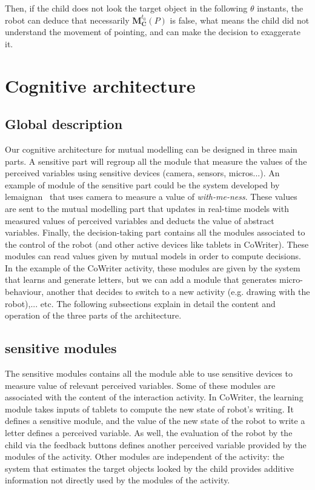 \documentclass[10pt,a4paper,twocolumn]{article}
\begin{document}
Then, if the child does not look the target object in the following $\theta$ instants, the robot can deduce that necessarily  $\textbf{M}^{t_0}_\textbf{C}(P)$ is false, what means the child did not understand the movement of pointing, and can make the decision to exaggerate it. 


\section{Cognitive architecture}

\subsection{Global description}

Our cognitive architecture for mutual modelling can be designed in three main parts. A sensitive part will regroup all the module that measure the values of the perceived variables using sensitive devices (camera, sensors, micros...). An example of module of the sensitive part could be the system developed by lemaignan~\cite{lemaignan2016realtime} that uses camera to measure a value of \textit{with-me-ness}. These values are sent to the mutual modelling part that updates in real-time models with measured values of perceived variables and deducts the value of abstract variables. Finally, the decision-taking part contains all the modules associated to the control of the robot (and other active devices like tablets in CoWriter). These modules can read values given by mutual models in order to compute decisions. In the example of the CoWriter activity, these modules are given by the system that learns and generate letters, but we can add a module that generates micro-behaviour, another that decides to switch to a new activity (e.g. drawing with the robot),... etc. The following subsections explain in detail the content and operation of the three parts of the architecture. 

\subsection{sensitive modules}

The sensitive modules contains all the module able to use sensitive devices to measure value of relevant perceived variables. Some of these modules are associated with the content of the interaction activity. In CoWriter, the learning module takes inputs of tablets to compute the new state of robot's writing. It defines a sensitive module, and the value of the new state of the robot to write a letter defines a perceived variable. As well, the evaluation of the robot by the child via the feedback buttons defines another perceived variable provided by the modules of the activity. Other modules are independent of the activity: the system that estimates the target objects looked by the child provides additive information not directly used by the modules of the activity.  
\end{document}
